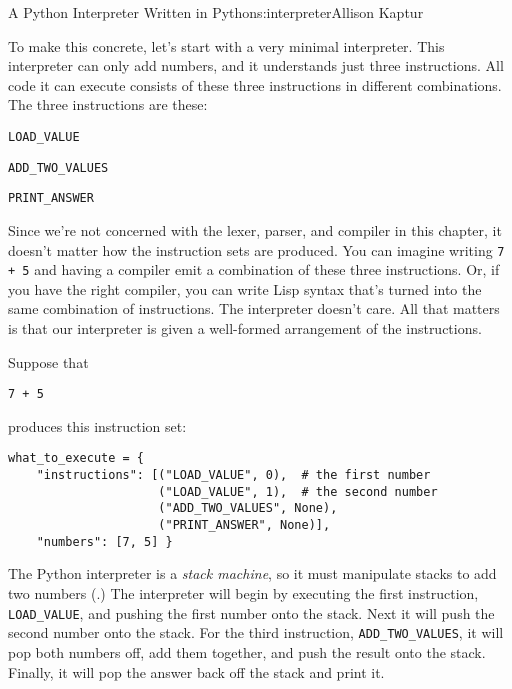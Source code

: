 \begin{aosachapter}{A Python Interpreter Written in Python}{s:interpreter}{Allison Kaptur}
\label{a-tiny-interpreter}

To make this concrete, let's start with a very minimal interpreter. This
interpreter can only add numbers, and it understands just three
instructions. All code it can execute consists of these three
instructions in different combinations. The three instructions are
these:

\begin{aosaitemize}

\item
  \texttt{LOAD\_VALUE}
\item
  \texttt{ADD\_TWO\_VALUES}
\item
  \texttt{PRINT\_ANSWER}
\end{aosaitemize}

Since we're not concerned with the lexer, parser, and compiler in this
chapter, it doesn't matter how the instruction sets are produced. You
can imagine writing \texttt{7 + 5} and having a compiler emit a
combination of these three instructions. Or, if you have the right
compiler, you can write Lisp syntax that's turned into the same
combination of instructions. The interpreter doesn't care. All that
matters is that our interpreter is given a well-formed arrangement of
the instructions.

Suppose that

\begin{verbatim}
7 + 5
\end{verbatim}

produces this instruction set:

\begin{verbatim}
what_to_execute = {
    "instructions": [("LOAD_VALUE", 0),  # the first number
                     ("LOAD_VALUE", 1),  # the second number
                     ("ADD_TWO_VALUES", None),
                     ("PRINT_ANSWER", None)],
    "numbers": [7, 5] }
\end{verbatim}

The Python interpreter is a \emph{stack machine}, so it must manipulate
stacks to add two numbers (.)
The interpreter will begin by executing the first instruction,
\texttt{LOAD\_VALUE}, and pushing the first number onto the stack. Next
it will push the second number onto the stack. For the third
instruction, \texttt{ADD\_TWO\_VALUES}, it will pop both numbers off,
add them together, and push the result onto the stack. Finally, it will
pop the answer back off the stack and print it.


\end{aosachapter}
